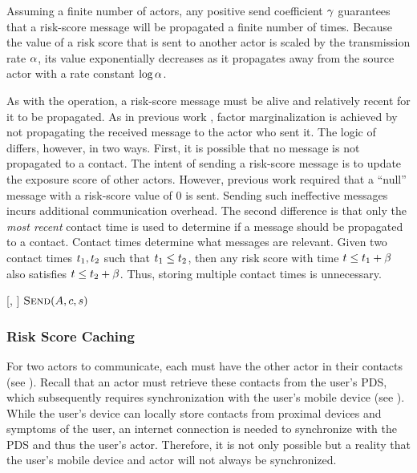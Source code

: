 Assuming a finite number of actors, any positive send coefficient $\gamma$ guarantees that a risk-score message will be propagated a finite number of times. Because the value of a risk score that is sent to another actor is scaled by the transmission rate $\alpha$, its value exponentially decreases as it propagates away from the source actor with a rate constant $\log \alpha$.

As with the \cSendCurrentOrCached[] operation, a risk-score message must be alive and relatively recent for it to be propagated. As in previous work \cite{Ayday2021}, factor marginalization is achieved by not propagating the received message to the actor who sent it. The logic of \cPropagate[] differs, however, in two ways. First, it is possible that no message is not propagated to a contact. The intent of sending a risk-score message is to update the exposure score of other actors. However, previous work \cite{Ayday2021} required that a ``null'' message with a risk-score value of 0 is sent. Sending such ineffective messages incurs additional communication overhead. The second difference is that only the \emph{most recent} contact time is used to determine if a message should be propagated to a contact. Contact times determine what messages are relevant. Given two contact times $t_1, t_2$ such that $t_1 \leq t_2$, then any risk score with time $t \leq t_1 + \beta$ also satisfies $t \leq t_2 + \beta$. Thus, storing multiple contact times is unnecessary.
%
\begin{function}{\nPropagate}[\vActor, \vScore]
    \ForEach{$\vContact \in \aActorContacts$}
    	\If{$\cShouldReceive[\vContact, \vScore]$}
    		\State $\cSend[\vActor, \vContact, \vScore]$
    	\EndIf
    \EndFor
\end{function}

\subsubsection{Risk Score Caching}\label{sec:caching}

For two actors to communicate, each must have the other actor in their contacts (see ). Recall that an actor must retrieve these contacts from the user's PDS, which subsequently requires synchronization with the user's mobile device (see ). While the user's device can locally store contacts from proximal devices and symptoms of the user, an internet connection is needed to synchronize with the PDS and thus the user's actor. Therefore, it is not only possible but a reality that the user's mobile device and actor will not always be synchronized.

